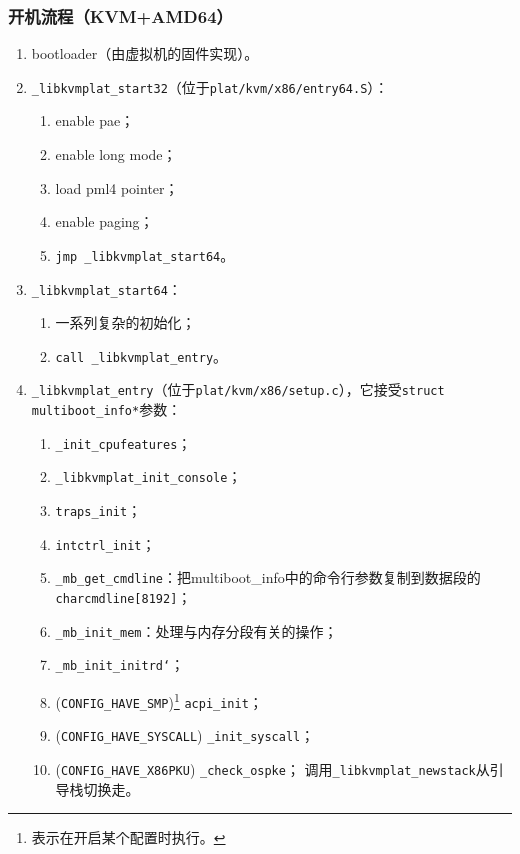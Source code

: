 \documentclass[UTF8,fontset=none,linespread=1.15]{ctexart}
\begin{document}
\subsubsection[开机流程]{开机流程（KVM+AMD64）}
\begin{enumerate}
\item bootloader（由虚拟机的固件实现）。
\item \texttt{\_libkvmplat\_start32}（位于\texttt{plat/kvm/x86/entry64.S}）：
    \begin{enumerate}
    \item enable pae；
    \item enable long mode；
    \item load pml4 pointer；
    \item enable paging；
    \item \texttt{jmp \_libkvmplat\_start64}。
    \end{enumerate}
\item \texttt{\_libkvmplat\_start64}：
    \begin{enumerate}
    \item 一系列复杂的初始化；
    \item \texttt{call \_libkvmplat\_entry}。
    \end{enumerate}
\item \texttt{\_libkvmplat\_entry}（位于\texttt{plat/kvm/x86/setup.c}），它接受\texttt{struct multiboot\_info*}参数：
    \begin{enumerate}
    \item \texttt{\_init\_cpufeatures}；
    \item \texttt{\_libkvmplat\_init\_console}；
    \item \texttt{traps\_init}；
    \item \texttt{intctrl\_init}；
    \item \texttt{\_mb\_get\_cmdline}：把multiboot\_info中的命令行参数复制到数据段的\texttt{char\linebreak cmdline[8192]}；
    \item \texttt{\_mb\_init\_mem}：处理与内存分段有关的操作；
    \item \texttt{\_mb\_init\_initrd`}；
    \item (\texttt{CONFIG\_HAVE\_SMP})\footnote{表示在开启某个配置时执行。} \texttt{acpi\_init}；
    \item (\texttt{CONFIG\_HAVE\_SYSCALL}) \texttt{\_init\_syscall}；
    \item (\texttt{CONFIG\_HAVE\_X86PKU}) \texttt{\_check\_ospke}；
    调用\texttt{\_libkvmplat\_newstack}从引导栈切换走。

\end{enumerate}
\end{enumerate}
\end{document}
